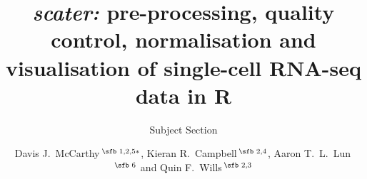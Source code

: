 \documentclass{bioinfo}
\begin{document}

\subtitle{Subject Section}

\title[scater scRNA-seq package]{\emph{scater:} pre-processing, quality control, normalisation and visualisation of single-cell RNA-seq data in R}
\author[McCarthy \textit{et~al}.~2016]{Davis J.~McCarthy\,$^{\text{\sfb 1,2,5}*}$, Kieran R.~Campbell\,$^{\text{\sfb 2,4}}$, Aaron T.~L.~Lun\,$^{\text{\sfb 6}}$ and Quin F.~Wills\,$^{\text{\sfb 2,3}}$}
\address{$^{\text{\sf 1}}$European Molecular Biology Laboratory - European Bioinformatics Institute (EMBL-EBI), Hinxton CB10 1SD, United Kingdom;\\
$^{\text{\sf 2}}$Wellcome Trust Centre for Human Genetics, University of Oxford,
Roosevelt Drive, Oxford OX3 7BN, United Kingdom;\\
$^{\text{\sf 3}}$Weatherall Institute for Molecular Medicine, University of Oxford, John Radcliffe Hospital, Oxford OX3 9DS, United Kingdom;\\
$^{\text{\sf 4}}$Department of Physiology, Anatomy and Genetics, University of Oxford, South Parks Road, Oxford OX1 3QX, United Kingdom;\\
$^{\text{\sf 5}}$St Vincent's Institute of Medical Research, 41 Victoria Parade, Fitzroy Victoria 3065, Australia; and \\
$^{\text{\sf 6}}$CRUK Cambridge Institute, University of Cambridge, Robinson Way, Cambridge CB2 0RE, United Kingdom.
}



\end{document}
